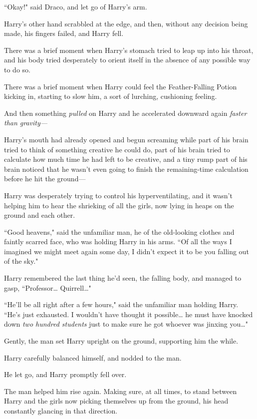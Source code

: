 ``Okay!" said Draco, and let go of Harry's arm.

Harry's other hand scrabbled at the edge, and then, without any decision being made, his fingers failed, and Harry fell.

There was a brief moment when Harry's stomach tried to leap up into his throat, and his body tried desperately to orient itself in the absence of any possible way to do so.

There was a brief moment when Harry could feel the Feather-Falling Potion kicking in, starting to slow him, a sort of lurching, cushioning feeling.

And then something \emph{pulled} on Harry and he accelerated downward again \emph{faster than gravity---}

Harry's mouth had already opened and begun screaming while part of his brain tried to think of something creative he could do, part of his brain tried to calculate how much time he had left to be creative, and a tiny rump part of his brain noticed that he wasn't even going to finish the remaining-time calculation before he hit the ground---

\later

Harry was desperately trying to control his hyperventilating, and it wasn't helping him to hear the shrieking of all the girls, now lying in heaps on the ground and each other.

``Good heavens," said the unfamiliar man, he of the old-looking clothes and faintly scarred face, who was holding Harry in his arms. ``Of all the ways I imagined we might meet again some day, I didn't expect it to be you falling out of the sky."

Harry remembered the last thing he'd seen, the falling body, and managed to gasp, ``Professor{\ldots} Quirrell{\ldots}"

``He'll be all right after a few hours," said the unfamiliar man holding Harry. ``He's just exhausted. I wouldn't have thought it possible{\ldots} he must have knocked down \emph{two hundred students} just to make sure he got whoever was jinxing you{\ldots}"

Gently, the man set Harry upright on the ground, supporting him the while.

Harry carefully balanced himself, and nodded to the man.

He let go, and Harry promptly fell over.

The man helped him rise again. Making sure, at all times, to stand between Harry and the girls now picking themselves up from the ground, his head constantly glancing in that direction.

